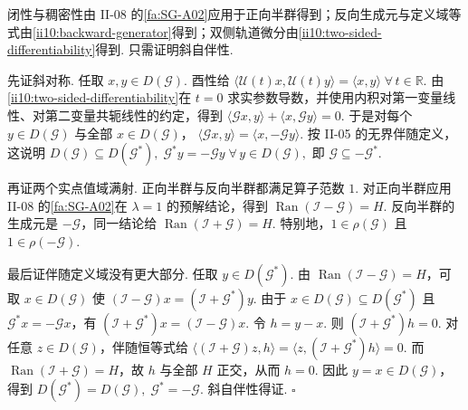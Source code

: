 \begin{FAProof}
闭性与稠密性由 II-08 的\autoref{fa:SG-A02}应用于正向半群得到；反向生成元与定义域等式由\autoref{ii10:backward-generator}得到；双侧轨道微分由\autoref{ii10:two-sided-differentiability}得到. 只需证明斜自伴性.

先证斜对称. 任取 \(\displaystyle x,y\in D(\mathcal G)\). 酉性给 \(\displaystyle \langle\mathcal U(t)x,\mathcal U(t)y\rangle = \langle x,y\rangle \; \forall\,t\in\mathbb R.\)
由\autoref{ii10:two-sided-differentiability}在 \(\displaystyle t=0\) 求实参数导数，并使用内积对第一变量线性、对第二变量共轭线性的约定，得到 \(\displaystyle \langle\mathcal Gx,y\rangle + \langle x,\mathcal Gy\rangle = 0.\)
于是对每个 \(\displaystyle y\in D(\mathcal G)\) 与全部 \(\displaystyle x\in D(\mathcal G)\)， \(\displaystyle \langle\mathcal Gx,y\rangle = \langle x,-\mathcal Gy\rangle.\)
按 II-05 的无界伴随定义，这说明 \(\displaystyle D(\mathcal G)\subseteq D(\mathcal G^*), \; \mathcal G^*y=-\mathcal Gy \; \forall\,y\in D(\mathcal G),\)
即 \(\displaystyle \mathcal G\subseteq-\mathcal G^*.\)

再证两个实点值域满射. 正向半群与反向半群都满足算子范数 \(\displaystyle1\). 对正向半群应用 II-08 的\autoref{fa:SG-A02}在 \(\displaystyle\lambda=1\) 的预解结论，得到 \(\displaystyle \operatorname{Ran}(\mathcal I-\mathcal G)=H.\)
反向半群的生成元是 \(\displaystyle-\mathcal G\)，同一结论给 \(\displaystyle \operatorname{Ran}(\mathcal I+\mathcal G)=H.\)
特别地，\(\displaystyle1\in\rho(\mathcal G)\) 且 \(\displaystyle1\in\rho(-\mathcal G)\).

最后证伴随定义域没有更大部分. 任取 \(\displaystyle y\in D(\mathcal G^*)\). 由 \(\displaystyle\operatorname{Ran}(\mathcal I-\mathcal G)=H\)，可取 \(\displaystyle x\in D(\mathcal G)\) 使 \(\displaystyle (\mathcal I-\mathcal G)x = (\mathcal I+\mathcal G^*)y.\)
由于 \(\displaystyle x\in D(\mathcal G)\subseteq D(\mathcal G^*)\) 且 \(\displaystyle\mathcal G^*x=-\mathcal Gx\)，有 \(\displaystyle (\mathcal I+\mathcal G^*)x = (\mathcal I-\mathcal G)x.\)
令 \(\displaystyle h=y-x\). 则 \(\displaystyle (\mathcal I+\mathcal G^*)h=0.\)
对任意 \(\displaystyle z\in D(\mathcal G)\)，伴随恒等式给 \(\displaystyle \langle(\mathcal I+\mathcal G)z,h\rangle = \langle z,(\mathcal I+\mathcal G^*)h\rangle = 0.\)
而 \(\displaystyle\operatorname{Ran}(\mathcal I+\mathcal G)=H\)，故 \(\displaystyle h\) 与全部 \(\displaystyle H\) 正交，从而 \(\displaystyle h=0\). 因此 \(\displaystyle y=x\in D(\mathcal G)\)，得到 \(\displaystyle D(\mathcal G^*)=D(\mathcal G), \; \mathcal G^*=-\mathcal G.\)
斜自伴性得证.
\hfill\(\square\)
\end{FAProof}

